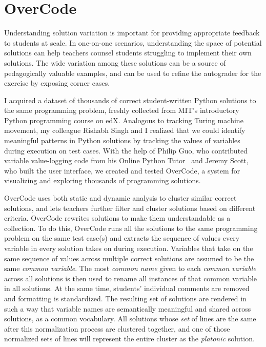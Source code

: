 \section{OverCode}

Understanding solution variation is important for providing appropriate feedback to students at scale. In one-on-one scenarios, understanding the space of potential solutions can help teachers counsel students struggling to implement their own solutions. The wide variation among these solutions can be a source of pedagogically valuable examples, and can be used to refine the autograder for the exercise by exposing corner cases. 

I acquired a dataset of thousands of correct student-written Python solutions to the same programming problem, freshly collected from MIT's introductory Python programming course on edX. Analogous to tracking Turing machine movement, my colleague Rishabh Singh and I realized that we could identify meaningful patterns in Python solutions by tracking the values of variables during execution on test cases. With the help of Philip Guo, who contributed variable value-logging code from his Online Python Tutor~\cite{pgbovineOPT} and Jeremy Scott, who built the user interface, we created and tested OverCode, a system for visualizing and exploring thousands of programming solutions.

OverCode uses both static and dynamic analysis to cluster similar correct solutions, and lets teachers further filter and cluster solutions based on different criteria. OverCode rewrites solutions to make them understandable as a collection. To do this, OverCode runs all the solutions to the same programming problem on the same test case(s) and extracts the sequence of values every variable in every solution takes on during execution. Variables that take on the same sequence of values across multiple correct solutions are assumed to be the same {\it common variable}. The most {\it common name} given to each {\it common variable} across all solutions is then used to rename all instances of that common variable in all solutions. At the same time, students' individual comments are removed and formatting is standardized. The resulting set of solutions are rendered in such a way that variable names are semantically meaningful and shared across solutions, as a common vocabulary. All solutions whose {\it set} of lines are the same after this normalization process are clustered together, and one of those normalized sets of lines will represent the entire cluster as the {\it platonic} solution. %

